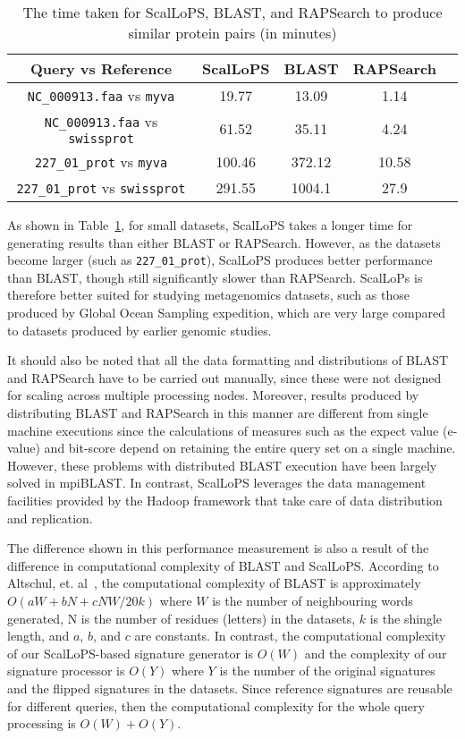\documentclass[titlepage]{csetr}
\begin{document}
\begin{table}[!ht]
\centering
\caption{The time taken for ScalLoPS, BLAST, and RAPSearch to produce similar protein pairs (in minutes)}
\label{tbl:PerformanceImprovement}
\begin{tabular} { | c | c | c | c | c |}
\hline
Query vs Reference & ScalLoPS & BLAST & RAPSearch \\
\hline
\texttt{NC\_000913.faa} vs \texttt{myva} & 19.77 & 13.09 & 1.14\\
\texttt{NC\_000913.faa} vs \texttt{swissprot} & 61.52 & 35.11 & 4.24\\
\texttt{227\_01\_prot} vs \texttt{myva} & 100.46 & 372.12 & 10.58\\
\texttt{227\_01\_prot} vs \texttt{swissprot} & 291.55 & 1004.1 & 27.9\\
\hline
\end{tabular}
\end{table}

As shown in Table~\ref{tbl:PerformanceImprovement}, for small datasets, ScalLoPS takes a longer time for generating results than either BLAST or RAPSearch. However, as the datasets become larger (such as \texttt{227\_01\_prot}), ScalLoPS produces better performance than BLAST, though still significantly slower than RAPSearch. ScalLoPs is therefore better suited for studying metagenomics datasets, such as those produced by Global Ocean Sampling expedition, which are very large compared to datasets produced by earlier genomic studies.

It should also be noted that all the data formatting and distributions of BLAST and RAPSearch have to be carried out manually, since these were not designed for scaling across multiple processing nodes. Moreover, results produced by distributing BLAST and RAPSearch in this manner are different from single machine executions since the calculations of measures such as the expect value (e-value) and bit-score depend on retaining the entire query set on a single machine. However, these problems with distributed BLAST execution have been largely solved in mpiBLAST. In contrast, ScalLoPS leverages the data management facilities provided by the Hadoop framework that take care of data distribution and replication. 

The difference shown in this performance measurement is also a result of the difference in computational complexity of BLAST and ScalLoPS. According to Altschul, et. al~\cite{BLAST}, the computational complexity of BLAST is approximately $O(aW + bN + cN W/20k)$ where $W$ is the number of neighbouring words generated, N is the number of residues (letters) in the datasets, $k$ is the shingle length, and $a$, $b$, and $c$ are constants. In contrast, the computational complexity of our ScalLoPS-based signature generator is $O(W)$ and the complexity of our signature processor is $O(Y)$ where $Y$ is the number of the original signatures and the flipped signatures in the datasets. Since reference signatures are reusable for different queries, then the computational complexity for the whole query processing is $O(W)+O(Y)$.
\end{document}
